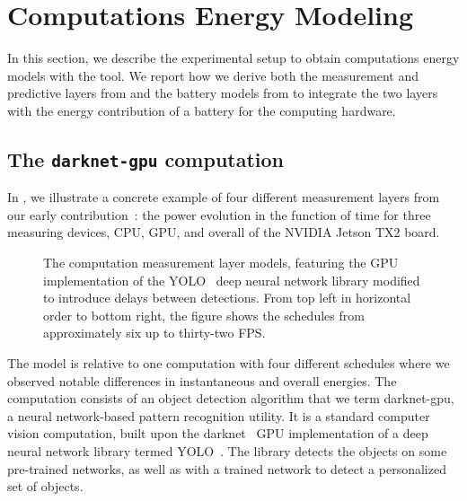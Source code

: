 \section{Computations Energy Modeling}
\label{sec:res-ene-comps}

In this section, we describe the experimental setup to obtain computations energy models with the \powprof{} tool. We report how we derive both the measurement and predictive layers from  and the battery models from  to integrate the two layers with the energy contribution of a battery for the computing hardware.

\subsection*{The \texttt{darknet-gpu} computation}

In , we illustrate a concrete example of four different measurement layers from our early contribution~\citep{seewald2019coarse}: the power evolution in the function of time for three measuring devices, CPU, GPU, and overall of the NVIDIA Jetson TX2 board. 
\begin{figure}[h!]
  \begin{minipage}{.93\textwidth}
  \centering
  \selectfont
  \hspace*{20ex}
  
  \end{minipage}
  \caption[The  computation measurement layer models]{The  computation measurement layer models, featuring the GPU implementation of the YOLO~\citep{redmon2016you} deep neural network library modified to introduce delays between detections. From top left in horizontal order to bottom right, the figure shows the schedules from approximately six up to thirty-two FPS.
  }
  \label{fig:darknet-layer1}
\end{figure}
The model is relative to one computation with four different schedules where we observed notable differences in instantaneous and overall energies. The computation consists of an object detection algorithm that we term darknet-gpu, a neural network-based pattern recognition utility. It is a standard computer vision computation, built upon the darknet~\citep{redmond2017yolo,redomnd2013darknet} GPU implementation of a deep neural network library termed YOLO~\citep{redmon2016you}. The library detects the objects on some pre-trained networks, as well as with a  trained network to detect a personalized set of objects.

